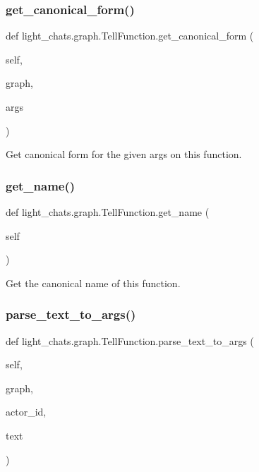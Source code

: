 \subsubsection{\texorpdfstring{get\+\_\+canonical\+\_\+form()}{get\_canonical\_form()}}
{\footnotesize\ttfamily def light\+\_\+chats.\+graph.\+Tell\+Function.\+get\+\_\+canonical\+\_\+form (\begin{DoxyParamCaption}\item[{}]{self,  }\item[{}]{graph,  }\item[{}]{args }\end{DoxyParamCaption})}

\begin{DoxyVerb}Get canonical form for the given args on this function.
\end{DoxyVerb}
 \mbox{\label{classlight__chats_1_1graph_1_1TellFunction_a39a099e864d0d20f997c03d96d7e1df8}} 
\subsubsection{\texorpdfstring{get\+\_\+name()}{get\_name()}}
{\footnotesize\ttfamily def light\+\_\+chats.\+graph.\+Tell\+Function.\+get\+\_\+name (\begin{DoxyParamCaption}\item[{}]{self }\end{DoxyParamCaption})}

\begin{DoxyVerb}Get the canonical name of this function.
\end{DoxyVerb}
 \mbox{\label{classlight__chats_1_1graph_1_1TellFunction_a88ac4115a6cca664cd220fb0b8852629}} 
\subsubsection{\texorpdfstring{parse\+\_\+text\+\_\+to\+\_\+args()}{parse\_text\_to\_args()}}
{\footnotesize\ttfamily def light\+\_\+chats.\+graph.\+Tell\+Function.\+parse\+\_\+text\+\_\+to\+\_\+args (\begin{DoxyParamCaption}\item[{}]{self,  }\item[{}]{graph,  }\item[{}]{actor\+\_\+id,  }\item[{}]{text }\end{DoxyParamCaption})}

